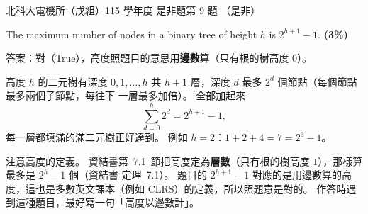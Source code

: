 \begin{pastexam}[label={px:ntut-115-ee-ds-09}]{北科大電機所（戊組）115 學年度 是非題第 9 題}
（是非）

The maximum number of nodes in a binary tree of height $h$ is $2^{h+1}-1$. \textbf{(3\%)}
\end{pastexam}

\begin{pastsoln}
答案：對（True），高度照題目的意思用\textbf{邊數}算（只有根的樹高度 $0$）。

高度 $h$ 的二元樹有深度 $0, 1, \ldots, h$ 共 $h + 1$ 層，深度 $d$ 最多 $2^d$ 個節點（每個節點最多兩個子節點，每往下
一層最多加倍）。 全部加起來
\[
\sum_{d=0}^{h} 2^d = 2^{h+1} - 1 ,
\]
每一層都填滿的滿二元樹正好達到。 例如 $h = 2$：$1 + 2 + 4 = 7 = 2^3 - 1$。

注意高度的定義。 資結書第~7.1~節把高度定為\textbf{層數}（只有根的樹高度 $1$），那樣算最多是 $2^h - 1$ 個（資結書
定理~7.1）。 題目的 $2^{h+1} - 1$ 對應的是用邊數算的高度，這也是多數英文課本（例如 CLRS）的定義，所以照題意是對的。
作答時遇到這種題目，最好寫一句「高度以邊數計」。
\end{pastsoln}

